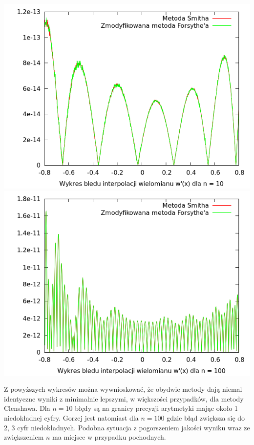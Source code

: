 \documentclass[11pt,leqno]{article}
\begin{document}
\begin{center}
\includegraphics[scale=0.65,natwidth=640,natheight=480]{plot/poly10dezoom.png}\\
\includegraphics[scale=0.65,natwidth=640,natheight=480]{plot/poly100dezoom.png}\\
\end{center}

Z powyższych wykresów można wywnioskować, że obydwie metody dają niemal identyczne wyniki z minimalnie lepszymi, w większości przypadków, dla metody Clenshawa. Dla $n = 10$ błędy są na granicy precyzji arytmetyki mając około 1 niedokładnej cyfry. Gorzej jest natomiast dla $n = 100$ gdzie błąd zwiększa się do 2, 3 cyfr niedokładnych. Podobna sytuacja z pogorszeniem jakości wyniku wraz ze zwiększeniem $n$ ma miejsce w przypadku pochodnych.
\end{document}
